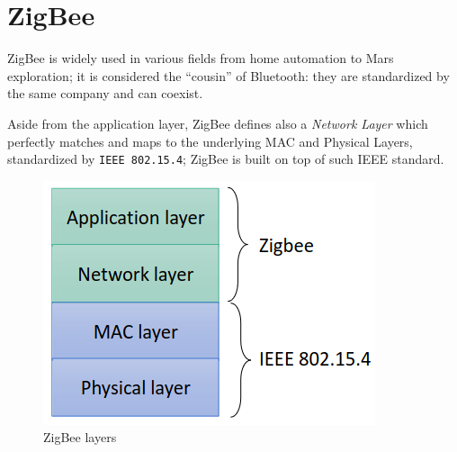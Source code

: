\chapter{ZigBee}

ZigBee is widely used in various fields from home automation to Mars exploration; it is considered the ``cousin'' of Bluetooth: they are standardized by the same company and can coexist.

\begin{paracol}{2}

   \colfill
   Aside from the application layer, ZigBee defines also a \textit{Network Layer} which perfectly matches and maps to the underlying MAC and Physical Layers, standardized by \texttt{IEEE 802.15.4};
   ZigBee is built on top of such IEEE standard.
   \colfill

   \switchcolumn
   
   \begin{figure}[htbp]
      \centering
      \includegraphics{images/zigbee_layers.png}
      \caption{ZigBee layers}
      \label{fig:zigbee_layers}
   \end{figure}
\end{paracol}

